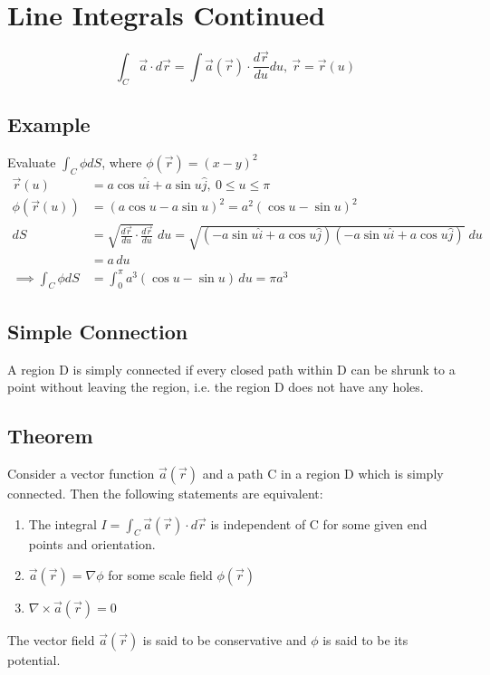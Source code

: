 \documentclass[a4paper, 11pt, normalem]{report}
\newcommand\veca{\vec{a}(\vec{r})}
\newcommand\veru{\vec{r}(u)}
\begin{document}
\section{Line Integrals Continued}
\begin{equation*}
    \int_C \vec{a} \cdot d\vec{r} = \int \veca \cdot \frac{d\vec{r}}{du}du,~ \vec{r} = \veru
\end{equation*}

\subsection{Example}
Evaluate $\int_C \phi dS$, where $\phi(\vec{r}) = (x - y)^2$
\begin{align*}
    \veru &= a\cos u \hat{i} + a\sin u \hat{j},~ 0 \leq u \leq \pi \\
    \phi(\veru) &= (a\cos u - a\sin u)^2 = a^2(\cos u - \sin u)^2 \\
    dS &= \sqrt{\frac{d\vec{r}}{du}\cdot\frac{d\vec{r}}{du}}\; du = \sqrt{(-a\sin u \hat{i} + a\cos u \hat{j})(-a\sin u \hat{i} + a\cos u \hat{j})}\;du \\
    &= a\,du \\
    \implies \int_C \phi dS &= \int_0^\pi a^3 (\cos u - \sin u)\,du = \pi a^3
\end{align*}

\subsection{Simple Connection}
A region D is simply connected if every closed path within D can be shrunk to a point without leaving the region, i.e. the region D does not have any holes.

\subsection{Theorem}
Consider a vector function $\veca$ and a path C in a region D which is simply connected. Then the following statements are equivalent:
\begin{enumerate}
    \item The integral $I = \int_C \veca \cdot d\vec{r}$ is independent of C for some given end points and orientation.
    \item $\veca = \nabla \phi$ for some scale field $\phi(\vec{r})$
    \item $\nabla \times \veca = 0$
\end{enumerate}
The vector field $\veca$ is said to be conservative and $\phi$ is said to be its potential.
\end{document}
